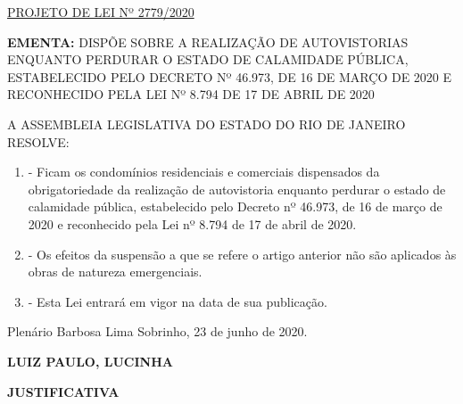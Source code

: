 \documentclass[10pt]{article}
\date{}
\begin{document}
\maketitle
\begin{center}
  \huge
  \vspace{-3cm}\href{http://alerjln1.alerj.rj.gov.br/scpro1923.nsf/f4b46b3cdbba990083256cc900746cf6/e0d68ac5331848790325859000612065?OpenDocument}{PROJETO DE LEI Nº 2779/2020}
\bigskip
\bigskip
\bigskip
  
\end{center}

\textbf{EMENTA:} 
DISPÕE SOBRE A REALIZAÇÃO DE AUTOVISTORIAS ENQUANTO PERDURAR O ESTADO DE CALAMIDADE PÚBLICA, ESTABELECIDO PELO DECRETO Nº 46.973, DE 16 DE MARÇO DE 2020 E RECONHECIDO PELA LEI Nº 8.794 DE 17 DE ABRIL DE 2020








\bigskip

\noindent
A ASSEMBLEIA LEGISLATIVA DO ESTADO DO RIO DE JANEIRO RESOLVE:

\begin{enumerate}[label=Art. \arabic*\textdegree]
\item - Ficam os condomínios residenciais e comerciais dispensados da obrigatoriedade da realização de autovistoria enquanto perdurar o estado de calamidade pública, estabelecido pelo Decreto nº 46.973, de 16 de março de 2020 e reconhecido pela Lei nº 8.794 de 17 de abril de 2020. 

\item - Os efeitos da suspensão a que se refere o artigo anterior não são aplicados às obras de natureza emergenciais. 

\item - Esta Lei entrará em vigor na data de sua publicação. 

\end{enumerate}




\begin{center}
  Plenário Barbosa Lima Sobrinho, 23 de junho de 2020.

   \bigskip

  \textbf{ LUIZ PAULO, LUCINHA}

  \bigskip

  \textbf{JUSTIFICATIVA}
  \bigskip

\end{center}
\end{document}
